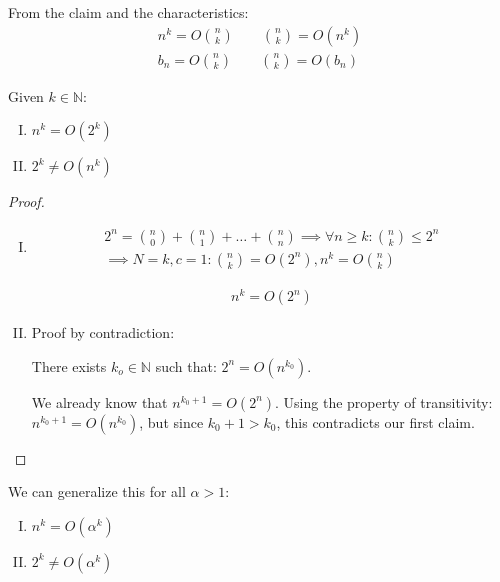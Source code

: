 \documentclass[00_complete]{subfiles}
\begin{document}
\begin{conclusion}
    From the claim and the characteristics:
    \begin{gather*}
        n^k = O\binom{n}{k} \qquad \binom{n}{k} = O(n^k) \\
        b_n = O\binom{n}{k} \qquad \binom{n}{k} = O(b_n)
    \end{gather*}
\end{conclusion}
\begin{claim}
    Given $k \in \mathbb{N}$:
\begin{enumerate}[I.]
    \item $n^k=O(2^k)$
    \item $2^k \neq O(n^k)$
\end{enumerate}
\begin{proof}
    \begin{enumerate}[I.]
    \item \begin{gather*}
        2^n = \binom{n}{0} + \binom{n}{1} + \dots + \binom{n}{n} \implies
        \forall n \geq k: \binom{n}{k}\leq 2^n \\
        \implies N=k, c=1: \binom{n}{k}=O(2^n), n^k=O\binom{n}{k}
    \end{gather*}
    \begin{conclusion}
        \begin{gather*}
            n^k=O(2^n) \tag{\checkmark}
        \end{gather*}
    \end{conclusion}
    \item Proof by contradiction:

    There exists $k_o \in \mathbb{N}$ such that: $2^n = O(n^{k_0})$.

    We already know that $n^{k_0+1}=O(2^n)$. Using the property of
    transitivity: $n^{k_0+1}=O(n^{k_0})$, but since $k_0+1>k_0$, this
    contradicts our first claim.
    \end{enumerate}
\end{proof}
\begin{note}
    We can generalize this for all $\alpha>1$:
\begin{enumerate}[I.]
    \item $n^k=O(\alpha^k)$
    \item $2^k \neq O(\alpha^k)$
\end{enumerate}
\end{note}
\end{claim}
\end{document}
